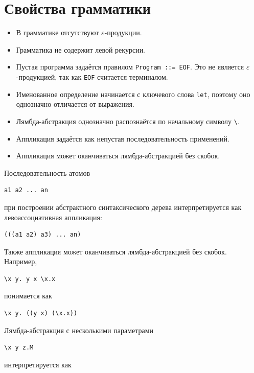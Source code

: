 \documentclass[12pt,a4paper]{article}
\begin{document}
\section*{Свойства грамматики}

\begin{itemize}
\item В грамматике отсутствуют $\varepsilon$-продукции.
\item Грамматика не содержит левой рекурсии.
\item Пустая программа задаётся правилом \texttt{Program ::= EOF}.
Это не является $\varepsilon$-продукцией, так как \texttt{EOF}
считается терминалом.
\item Именованное определение начинается с ключевого слова \texttt{let},
поэтому оно однозначно отличается от выражения.
\item Лямбда-абстракция однозначно распознаётся по начальному символу
\texttt{\textbackslash}.
\item Аппликация задаётся как непустая последовательность применений.
\item Аппликация может оканчиваться лямбда-абстракцией без скобок.
\end{itemize}

Последовательность атомов

\begin{verbatim}
a1 a2 ... an
\end{verbatim}

при построении абстрактного синтаксического дерева интерпретируется как
левоассоциативная аппликация:

\begin{verbatim}
(((a1 a2) a3) ... an)
\end{verbatim}

Также аппликация может оканчиваться лямбда-абстракцией без скобок.
Например,

\begin{verbatim}
\x y. y x \x.x
\end{verbatim}

понимается как

\begin{verbatim}
\x y. ((y x) (\x.x))
\end{verbatim}

Лямбда-абстракция с несколькими параметрами

\begin{verbatim}
\x y z.M
\end{verbatim}

интерпретируется как
\end{document}
